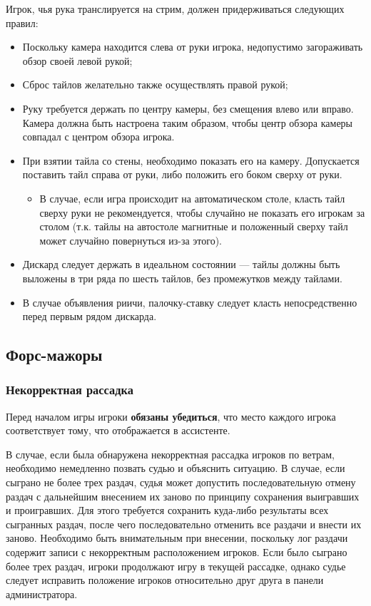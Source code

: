 Игрок, чья рука транслируется на стрим, должен придерживаться следующих правил:
\begin{itemize}
	\item Поскольку камера находится слева от руки игрока, недопустимо загораживать обзор своей левой рукой;
	\item Сброс тайлов желательно также осуществлять правой рукой;
	\item Руку требуется держать по центру камеры, без смещения влево или вправо. Камера должна быть настроена таким образом, чтобы центр обзора камеры совпадал с центром обзора игрока.
	\item При взятии тайла со стены, необходимо показать его на камеру. Допускается поставить тайл справа от руки, либо положить его боком сверху от руки. 
	\begin{itemize}
		\item В случае, если игра происходит на автоматическом столе, класть тайл сверху руки не рекомендуется, чтобы случайно не показать его игрокам за столом (т.к. тайлы на автостоле магнитные и положенный сверху тайл может случайно повернуться из-за этого).
	\end{itemize}
	\item Дискард следует держать в идеальном состоянии --- тайлы должны быть выложены в три ряда по шесть тайлов, без промежутков между тайлами. 
	\item В случае объявления риичи, палочку-ставку следует класть непосредственно перед первым рядом дискарда.
\end{itemize}

\subsection{Форс-мажоры}

\subsubsection{Некорректная рассадка}

Перед началом игры игроки \textbf{обязаны убедиться}, что место каждого игрока соответствует тому, что отображается в ассистенте.

В случае, если была обнаружена некорректная рассадка игроков по ветрам, необходимо немедленно позвать судью и объяснить ситуацию. В случае, если сыграно не более трех раздач, судья может допустить последовательную отмену раздач с дальнейшим внесением их заново по принципу сохранения выигравших и проигравших. Для этого требуется сохранить куда-либо результаты всех сыгранных раздач, после чего последовательно отменить все раздачи и внести их заново. Необходимо быть внимательным при внесении, поскольку лог раздачи содержит записи с некорректным расположением игроков. Если было сыграно более трех раздач, игроки продолжают игру в текущей рассадке, однако судье следует исправить положение игроков относительно друг друга в панели администратора.

